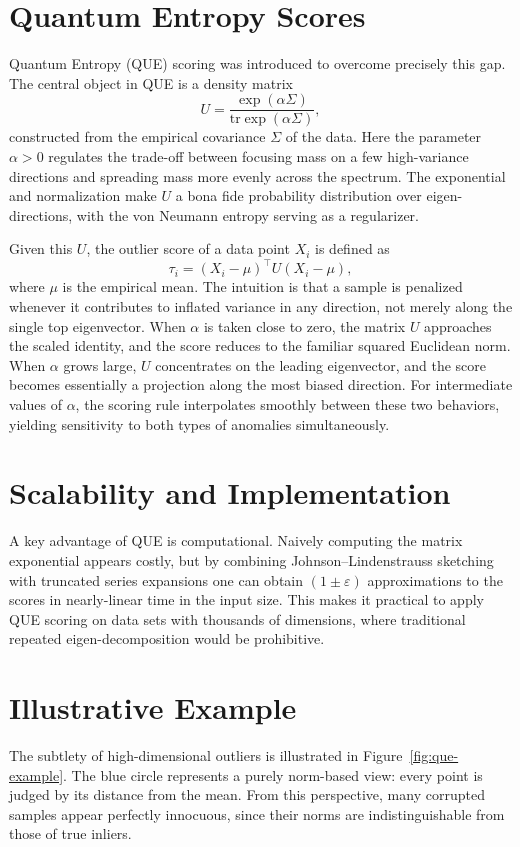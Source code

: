 \documentclass[11pt]{article}
\begin{document}
\section{Quantum Entropy Scores}
Quantum Entropy (QUE) scoring was introduced to overcome precisely this gap. The central object in QUE is a density matrix
\[
U = \frac{\exp(\alpha \Sigma)}{\mathrm{tr} \exp(\alpha \Sigma)},
\]
constructed from the empirical covariance $\Sigma$ of the data. Here the parameter $\alpha > 0$ regulates the trade-off between focusing mass on a few high-variance directions and spreading mass more evenly across the spectrum. The exponential and normalization make $U$ a bona fide probability distribution over eigen-directions, with the von Neumann entropy serving as a regularizer.

Given this $U$, the outlier score of a data point $X_i$ is defined as
\[
\tau_i = (X_i - \mu)^\top U (X_i - \mu),
\]
where $\mu$ is the empirical mean. The intuition is that a sample is penalized whenever it contributes to inflated variance in any direction, not merely along the single top eigenvector. When $\alpha$ is taken close to zero, the matrix $U$ approaches the scaled identity, and the score reduces to the familiar squared Euclidean norm. When $\alpha$ grows large, $U$ concentrates on the leading eigenvector, and the score becomes essentially a projection along the most biased direction. For intermediate values of $\alpha$, the scoring rule interpolates smoothly between these two behaviors, yielding sensitivity to both types of anomalies simultaneously.

\section{Scalability and Implementation}
A key advantage of QUE is computational. Naively computing the matrix exponential appears costly, but by combining Johnson–Lindenstrauss sketching with truncated series expansions one can obtain $(1\pm \varepsilon)$ approximations to the scores in nearly-linear time in the input size. This makes it practical to apply QUE scoring on data sets with thousands of dimensions, where traditional repeated eigen-decomposition would be prohibitive.

\section{Illustrative Example}
The subtlety of high-dimensional outliers is illustrated in Figure~\ref{fig:que-example}. The blue circle represents a purely norm-based view: every point is judged by its distance from the mean. From this perspective, many corrupted samples appear perfectly innocuous, since their norms are indistinguishable from those of true inliers.
\end{document}

